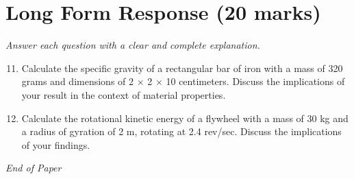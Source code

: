 \documentclass[12pt]{article}
\begin{document}
\section*{Long Form Response (20 marks)}
\textit{Answer each question with a clear and complete explanation.}
\begin{enumerate}[label=\arabic*.]
\setcounter{enumi}{10}
\item Calculate the specific gravity of a rectangular bar of iron with a mass of 320 grams and dimensions of 2 \ensuremath{\times} 2 \ensuremath{\times} 10 centimeters. Discuss the implications of your result in the context of material properties.
\item Calculate the rotational kinetic energy of a flywheel with a mass of 30 kg and a radius of gyration of 2 m, rotating at 2.4 rev/sec. Discuss the implications of your findings.
\end{enumerate}

\vfill
\noindent\textit{End of Paper}
\end{document}
